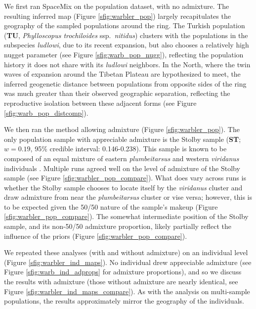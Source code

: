 \documentclass[12pt]{article}
\begin{document}
We first ran SpaceMix on the population dataset, with no admixture. The resulting inferred map (Figure \ref{sfig:warbler_pop}) largely recapitulates the geography of the sampled populations around the ring.  The Turkish population (\textbf{TU}, \textit{Phylloscopus trochiloides} ssp.\ \textit{nitidus}) clusters with the populations in the subspecies \textit{ludlowi}, due to its recent expansion, but also chooses a relatively high nugget parameter (see Figure \ref{sfig:warb_pop_nugg}), reflecting the population history it does not share with its \textit{ludlowi} neighbors.  In the North, where the twin waves of expansion around the Tibetan Plateau are hypothesized to meet, the inferred geogenetic distance between populations from opposite sides of the ring was much greater than their observed geographic separation, reflecting the reproductive isolation between these adjacent forms (see Figure \ref{sfig:warb_pop_distcomp}).  

We then ran the method allowing admixture (Figure \ref{sfig:warbler_pop}). The only population sample with appreciable admixture is the Stolby sample (\textbf{ST}; $w=0.19$, 95\% credible interval: 0.146-0.238).  This sample is known to be composed of an equal mixture of eastern \textit{plumbeitarsus} and western \textit{viridanus} individuals \citep{alcaide2014genomic}. Multiple runs agreed well on the level of admixture of the Stolby sample (see Figure \ref{sfig:warbler_pop_compare}). What does vary across runs is whether the Stolby sample chooses to locate itself by the \textit{viridanus} cluster and draw admixture from near the \textit{plumbeitarsus}  cluster or vise versa; however, this is to be expected given the 50/50 nature of the sample's makeup (Figure \ref{sfig:warbler_pop_compare}). The somewhat intermediate position of the Stolby sample, and its non-50/50 admixture proportion, likely partially reflect the influence of the priors (Figure \ref{sfig:warbler_pop_compare}). 

We repeated these analyses (with and without admixture) on an individual level (Figure \ref{sfig:warbler_ind_maps}).  
No individual drew appreciable admixture (see Figure \ref{sfig:warb_ind_adprops} for admixture proportions), and so we discuss the results with admixture (those without admixture are nearly identical, see Figure \ref{sfig:warbler_ind_maps_compare}).  As with the analysis on multi-sample populations, the results approximately mirror the geography of the individuals.
\end{document}
